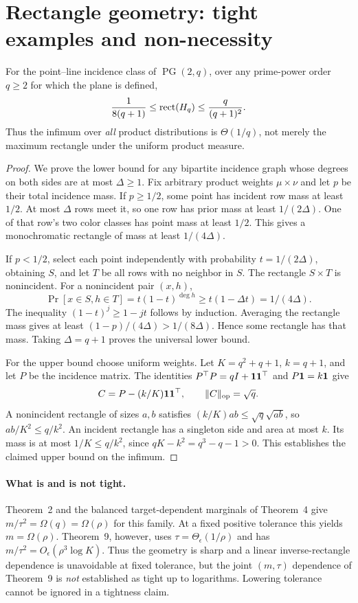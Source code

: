 \section{Rectangle geometry: tight examples and non-necessity}\label{sec:landscape}
\begin{theorem}\label{thm:pgglobal}
For the point--line incidence class of $\operatorname{PG}(2,q)$, over any prime-power order $q\ge2$ for which the plane is defined,
\[
 \frac1{8(q+1)}\le\operatorname{rect}(H_q)\le\frac{q}{(q+1)^2}.
\]
Thus the infimum over \emph{all} product distributions is $\Theta(1/q)$, not merely the maximum rectangle under the uniform product measure.
\end{theorem}
\begin{proof}
We prove the lower bound for any bipartite incidence graph whose degrees on both sides are at most $\Delta\ge1$. Fix arbitrary product weights $\mu\times\nu$ and let $p$ be their total incidence mass. If $p\ge1/2$, some point has incident row mass at least $1/2$. At most $\Delta$ rows meet it, so one row has prior mass at least $1/(2\Delta)$. One of that row's two color classes has point mass at least $1/2$. This gives a monochromatic rectangle of mass at least $1/(4\Delta)$.

If $p<1/2$, select each point independently with probability $t=1/(2\Delta)$, obtaining $S$, and let $T$ be all rows with no neighbor in $S$. The rectangle $S\times T$ is nonincident. For a nonincident pair $(x,h)$,
\[
 \Pr[x\in S,h\in T]=t(1-t)^{\deg h}
 \ge t(1-\Delta t)=1/(4\Delta).
\]
The inequality $(1-t)^j\ge1-jt$ follows by induction. Averaging the rectangle mass gives at least $(1-p)/(4\Delta)>1/(8\Delta)$. Hence some rectangle has that mass. Taking $\Delta=q+1$ proves the universal lower bound.

For the upper bound choose uniform weights. Let $K=q^2+q+1$, $k=q+1$, and let $P$ be the incidence matrix. The identities $P^\top P=qI+\mathbf 1\mathbf 1^\top$ and $P\mathbf 1=k\mathbf 1$ give
\[
 C=P-(k/K)\mathbf 1\mathbf 1^\top,\qquad \|C\|_{\rm op}=\sqrt q.
\]
A nonincident rectangle of sizes $a,b$ satisfies $(k/K)ab\le\sqrt q\sqrt{ab}$, so $ab/K^2\le q/k^2$. An incident rectangle has a singleton side and area at most $k$. Its mass is at most $1/K\le q/k^2$, since $qK-k^2=q^3-q-1>0$. This establishes the claimed upper bound on the infimum.
\end{proof}

\paragraph{What is and is not tight.}
Theorem~2 and the balanced target-dependent marginals of Theorem~4 give $m/\tau^2=\Omega(q)=\Omega(\rho)$ for this family. At a fixed positive tolerance this yields $m=\Omega(\rho)$. Theorem~9, however, uses $\tau=\Theta_\epsilon(1/\rho)$ and has $m/\tau^2=O_\epsilon(\rho^3\log K)$. Thus the geometry is sharp and a linear inverse-rectangle dependence is unavoidable at fixed tolerance, but the joint $(m,\tau)$ dependence of Theorem~9 is \emph{not} established as tight up to logarithms. Lowering tolerance cannot be ignored in a tightness claim.

